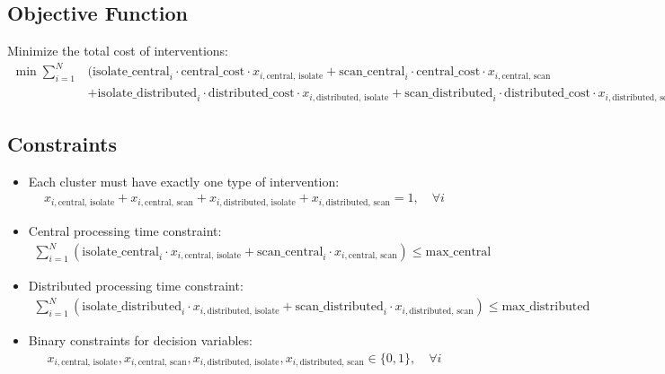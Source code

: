 \documentclass{article}
\begin{document}
\subsection*{Objective Function}
Minimize the total cost of interventions:
\begin{align*}
\min \sum_{i=1}^{N} & (\text{isolate\_central}_i \cdot \text{central\_cost} \cdot x_{i, \text{central, isolate}} + \text{scan\_central}_i \cdot \text{central\_cost} \cdot x_{i, \text{central, scan}} \\
& + \text{isolate\_distributed}_i \cdot \text{distributed\_cost} \cdot x_{i, \text{distributed, isolate}} + \text{scan\_distributed}_i \cdot \text{distributed\_cost} \cdot x_{i, \text{distributed, scan}})
\end{align*}

\subsection*{Constraints}
\begin{itemize}
    \item Each cluster must have exactly one type of intervention:
    \begin{align*}
    x_{i, \text{central, isolate}} + x_{i, \text{central, scan}} + x_{i, \text{distributed, isolate}} + x_{i, \text{distributed, scan}} = 1, \quad \forall i
    \end{align*}
    
    \item Central processing time constraint:
    \begin{align*}
    \sum_{i=1}^{N} (\text{isolate\_central}_i \cdot x_{i, \text{central, isolate}} + \text{scan\_central}_i \cdot x_{i, \text{central, scan}}) \leq \text{max\_central}
    \end{align*}
    
    \item Distributed processing time constraint:
    \begin{align*}
    \sum_{i=1}^{N} (\text{isolate\_distributed}_i \cdot x_{i, \text{distributed, isolate}} + \text{scan\_distributed}_i \cdot x_{i, \text{distributed, scan}}) \leq \text{max\_distributed}
    \end{align*}
    
    \item Binary constraints for decision variables:
    \begin{align*}
    x_{i, \text{central, isolate}}, x_{i, \text{central, scan}}, x_{i, \text{distributed, isolate}}, x_{i, \text{distributed, scan}} \in \{0, 1\}, \quad \forall i
    \end{align*}
\end{itemize}
\end{document}
